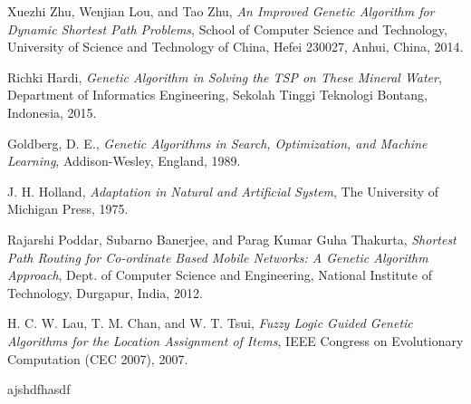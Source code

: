 \documentclass[journal]{IEEEtran}
\begin{document}
\begin{thebibliography}{5}

Xuezhi Zhu, Wenjian Lou, and Tao Zhu,
\textit{An Improved Genetic Algorithm for Dynamic Shortest Path Problems},
School of Computer Science and Technology, University of Science and Technology of China, Hefei 230027, Anhui, China, 2014.

Richki Hardi,
\textit{Genetic Algorithm in Solving the TSP on These Mineral Water},
Department of Informatics Engineering, Sekolah Tinggi Teknologi Bontang, Indonesia, 2015.

Goldberg, D. E.,
\textit{Genetic Algorithms in Search, Optimization, and Machine Learning},
Addison-Wesley, England, 1989.

J. H. Holland,
\textit{Adaptation in Natural and Artificial System},
The University of Michigan Press, 1975.

Rajarshi Poddar, Subarno Banerjee, and Parag Kumar Guha Thakurta,
\textit{Shortest Path Routing for Co-ordinate Based Mobile Networks: A Genetic Algorithm Approach},
Dept. of Computer Science and Engineering, National Institute of Technology, Durgapur, India, 2012.

H. C. W. Lau, T. M. Chan, and W. T. Tsui,
\textit{Fuzzy Logic Guided Genetic Algorithms for the Location Assignment of Items},
IEEE Congress on Evolutionary Computation (CEC 2007), 2007.

ajshdfhasdf

\end{thebibliography}
\end{document}
